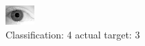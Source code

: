 \begin{figure}[h!]
\begin{center}
\includegraphics[width=0.60\columnwidth]{figures/ID2155_class_4_target_3.png}
\end{center}
\caption{ Classification: 4 actual target: 3}
\label{fig:ID2155_class_4_target_3}
\end{figure}
